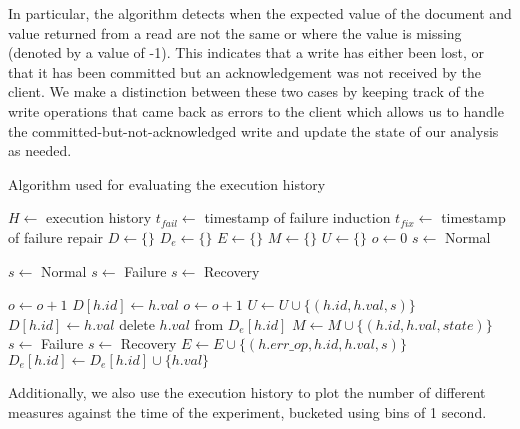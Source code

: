 In particular, the algorithm detects when the expected value of the document and value returned from a read are not the same or where the value is missing (denoted by a value of -1). This indicates that a write has either been lost, or that it has been committed but an acknowledgement was not received by the client. We make a distinction between these two cases by keeping track of the write operations that came back as errors to the client which allows us to handle the committed-but-not-acknowledged write and update the state of our analysis as needed. 

\begin{algorithm}
    \caption{Algorithm used for evaluating the execution history}
    \begin{algorithmic}
        \STATE $H \leftarrow$ execution history
        \STATE $t_{fail} \leftarrow$ timestamp of failure induction
        \STATE $t_{fix} \leftarrow$ timestamp of failure repair
        \STATE $D \leftarrow \{\}$ 
        \STATE $D_e \leftarrow \{\}$ 
        \STATE $E \leftarrow \{\}$ 
        \STATE $M \leftarrow \{\}$ 
        \STATE $U \leftarrow \{\}$ 
        \STATE $o \leftarrow 0$ 
        \STATE $s \leftarrow $ Normal 

                \STATE $s \leftarrow$ Normal
                \STATE $s \leftarrow$ Failure
            \ELSE
                \STATE $s \leftarrow$ Recovery
            \ENDIF

                \STATE $o \leftarrow o+1$
                \STATE $D[h.id] \leftarrow h.val$
                \STATE $o \leftarrow o+1$
                        \STATE $U \leftarrow U \cup \{(h.id, h.val, s)\}$
                        \STATE $D[h.id] \leftarrow h.val$
                        \STATE delete $h.val$ from $D_e[h.id]$
                    \ELSE
                        \STATE $M \leftarrow M \cup \{(h.id, h.val, state)\}$
                    \ENDIF
                \ENDIF
                \STATE $ s \leftarrow $ Failure
                \STATE $ s \leftarrow $ Recovery
                \STATE $E \leftarrow E \cup \{(h.err\_op, h.id, h.val, s)\}$
                    \STATE $D_e[h.id] \leftarrow D_e[h.id] \cup \{h.val\}$
                \ENDIF
            \ENDIF
        \ENDFOR
    \end{algorithmic}
    \label{alg:eval}
\end{algorithm}

Additionally, we also use the execution history to plot the number of different measures against the time of the experiment, bucketed using bins of 1 second.